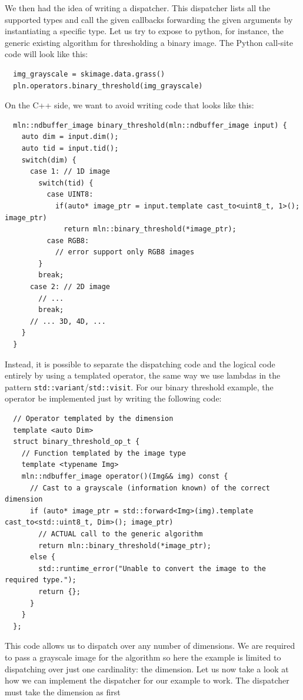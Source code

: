 We then had the idea of writing a dispatcher. This dispatcher lists all the supported types and call the given callbacks
forwarding the given arguments by instantiating a specific type. Let us try to expose to python, for instance, the
generic existing algorithm for thresholding a binary image. The Python call-site code will look like this:
\begin{verbatim}
  img_grayscale = skimage.data.grass()
  pln.operators.binary_threshold(img_grayscale)
\end{verbatim}
On the C++ side, we want to avoid writing code that looks like this:
\begin{verbatim}
  mln::ndbuffer_image binary_threshold(mln::ndbuffer_image input) {
    auto dim = input.dim();
    auto tid = input.tid();
    switch(dim) {
      case 1: // 1D image
        switch(tid) {
          case UINT8:
            if(auto* image_ptr = input.template cast_to<uint8_t, 1>(); image_ptr)
              return mln::binary_threshold(*image_ptr);
          case RGB8:
            // error support only RGB8 images
        }
        break;
      case 2: // 2D image
        // ...
        break;
      // ... 3D, 4D, ...
    }
  }
\end{verbatim}
Instead, it is possible to separate the dispatching code and the logical code entirely by using a templated operator,
the same way we use lambdas in the pattern \texttt{std::variant}/\texttt{std::visit}. For our binary threshold example,
the operator be implemented just by writing the following code:
\begin{verbatim}
  // Operator templated by the dimension
  template <auto Dim>
  struct binary_threshold_op_t {
    // Function templated by the image type
    template <typename Img>
    mln::ndbuffer_image operator()(Img&& img) const {
      // Cast to a grayscale (information known) of the correct dimension
      if (auto* image_ptr = std::forward<Img>(img).template cast_to<std::uint8_t, Dim>(); image_ptr)
        // ACTUAL call to the generic algorithm
        return mln::binary_threshold(*image_ptr);
      else {
        std::runtime_error("Unable to convert the image to the required type.");
        return {};
      }
    }
  };
\end{verbatim}
This code allows us to dispatch over any number of dimensions. We are required to pass a grayscale image for the
algorithm so here the example is limited to dispatching over just one cardinality: the dimension. Let us now take a look
at how we can implement the dispatcher for our example to work. The dispatcher must take the dimension as first
